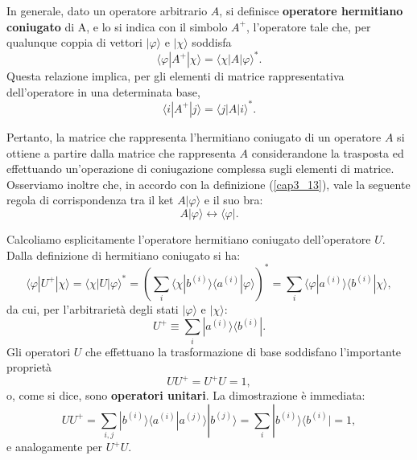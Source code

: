 In generale, dato un operatore arbitrario $A$, si definisce \textbf{operatore hermitiano coniugato} di A, e lo si indica con il simbolo $A^+$, l'operatore tale che, per qualunque coppia di vettori $| \varphi \rangle$ e $ | \chi \rangle $ soddisfa
	\begin{equation}
		\boxed{
			\langle \varphi | A^{+} | \chi \rangle = \langle \chi | A | \varphi \rangle ^* .
			}
	\label{cap3_13}
	\end{equation}
Questa relazione implica, per gli elementi di matrice rappresentativa dell'operatore in una determinata base,
	\begin{equation}
		\langle i | A^{+} | j \rangle = \langle j | A | i \rangle ^* .
	\end{equation}

Pertanto, la matrice che rappresenta l'hermitiano coniugato di un operatore $A$ si ottiene a partire dalla matrice che rappresenta $A$ considerandone la trasposta ed effettuando un'operazione di coniugazione complessa sugli elementi di matrice. Osserviamo inoltre che, in accordo con la definizione (\ref{cap3_13}), vale la seguente regola di corrispondenza tra il ket $A| \varphi \rangle$ e il suo bra:\\
	\begin{equation}
		\boxed{
			A| \varphi \rangle \leftrightarrow \langle \varphi | .
			}
	\end{equation}

Calcoliamo esplicitamente l'operatore hermitiano coniugato dell'operatore $U$. Dalla definizione di hermitiano coniugato si ha:
	\begin{equation}
		\langle \varphi | U^{+} | \chi \rangle = \langle \chi | U | \varphi \rangle ^* =  \left( \sum \limits_{i} \langle \chi | b^{(i)} \rangle \langle a^{(i)} | \varphi \rangle \right)^* =\sum \limits_{i} \langle \varphi | a^{(i)}\rangle \langle b^{(i)} | \chi \rangle ,
	\end{equation}
da cui, per l'arbitrarietà degli stati $| \varphi \rangle $ e $| \chi \rangle $:
	\begin{equation}
		\boxed{
			U^+ \equiv \sum \limits_{i} | a^{(i)} \rangle \langle b^{(i)} |  .
			}
	\end{equation}
Gli operatori $U$ che effettuano la trasformazione di base soddisfano l'importante proprietà
	\begin{equation}
		\boxed{\boxed{
			UU^+= U^+U=1 ,
			}}
	\end{equation}
o, come si dice, sono \textbf{operatori unitari}. La dimostrazione è immediata:
	\begin{equation}
		UU^+ = \sum\limits_{i,j}  | b^{(i)} \rangle \langle a^{(i)} | a^{(j)} \rangle | b^{(j)} \rangle = 
\sum\limits_{i} | b^{(i)} \rangle \langle b^{(i)} | = 1 ,
	\end{equation}
e analogamente per $U^+U$.\\

